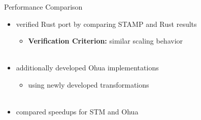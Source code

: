 \documentclass[aspectratio=169, usenames, dvipsnames]{beamer}
\begin{document}
\begin{frame}{Performance Comparison}
    \begin{itemize}
        \item verified Rust port by comparing STAMP and Rust results
            \begin{itemize}
                \item<2-> \textbf{Verification Criterion:} similar scaling behavior\\ \
            \end{itemize}
        \item<3-> additionally developed Ohua implementations
            \begin{itemize}
                \item<3-> using newly developed transformations\\ \
            \end{itemize}
        \item<4-> compared speedups for STM and Ohua
    \end{itemize}
\end{frame}

\end{document}
